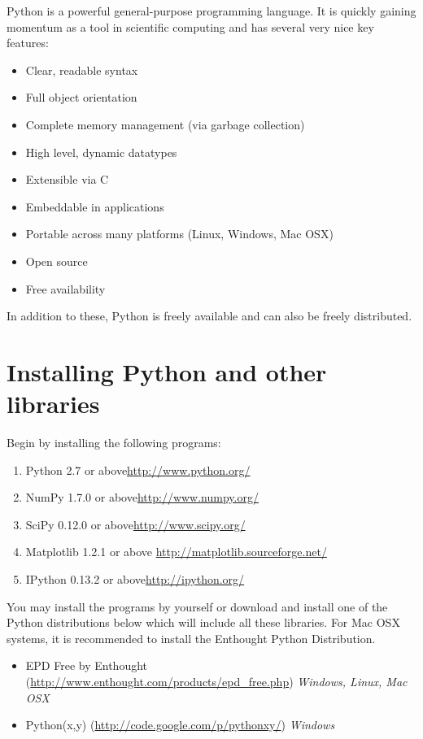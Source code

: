 \label{lab:Essential_Python}

Python is a powerful general-purpose programming language. 
It is quickly gaining momentum as a tool in scientific computing and has several very nice key features:
\begin{itemize}
\item Clear, readable syntax
\item Full object orientation
\item Complete memory management (via garbage collection)
\item High level, dynamic datatypes
\item Extensible via C
\item Embeddable in applications
\item Portable across many platforms (Linux, Windows, Mac OSX)
\item Open source
\item Free availability
\end{itemize}
In addition to these, Python is freely available and can also be freely distributed. 

\section*{Installing Python and other libraries}
Begin by installing the following programs:
\begin{enumerate}
\item Python 2.7 or above\url{http://www.python.org/}
\item NumPy 1.7.0 or above\url{http://www.numpy.org/}
\item SciPy 0.12.0 or above\url{http://www.scipy.org/}
\item Matplotlib 1.2.1 or above \url{http://matplotlib.sourceforge.net/}
\item IPython 0.13.2 or above\url{http://ipython.org/}
\end{enumerate}
You may install the programs by yourself or download and install one of the Python distributions below which will include all these libraries.
For Mac OSX systems, it is recommended to install the Enthought Python Distribution.
\begin{itemize}
\item EPD Free by Enthought (\url{http://www.enthought.com/products/epd_free.php}) \emph{Windows, Linux, Mac OSX}
\item Python(x,y) (\url{http://code.google.com/p/pythonxy/}) \emph{Windows}
\end{itemize}

